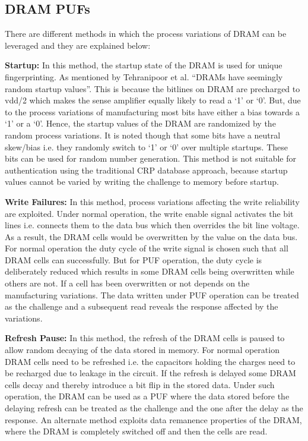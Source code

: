 \documentclass[journal, a4paper]{IEEEtran}
\begin{document}
\subsection{DRAM PUFs}
There are different methods in which the process variations of DRAM can be leveraged and they are explained below:

\textbf{Startup:} In this method, the startup state of the DRAM is used for unique fingerprinting. As mentioned by Tehranipoor et al. “DRAMs have seemingly random startup values”. This is because the bitlines on DRAM are precharged to vdd/2 which makes the sense amplifier equally likely to read a ‘1’ or ‘0’. But, due to the process variations of manufacturing most bits have either a bias towards a ‘1’ or a ‘0’. Hence, the startup values of the DRAM are randomized by the random process variations. It is noted though that some bits have a neutral skew/bias i.e. they randomly switch to ‘1’ or ‘0’ over multiple startups. These bits can be used for random number generation. This method is not suitable for authentication using the traditional CRP database approach, because startup values cannot be varied by writing the challenge to memory before startup.\cite{TEH15}

\textbf{Write Failures:} In this method, process variations affecting the write reliability are exploited. Under normal operation, the write enable signal activates the bit lines i.e. connects them to the data bus which then overrides the bit line voltage. As a result, the DRAM cells would be overwritten by the value on the data bus. For normal operation the duty cycle of the write signal is chosen such that all DRAM cells can successfully. But for PUF operation, the duty cycle is deliberately reduced which results in some DRAM cells being overwritten while others are not. If a cell has been overwritten or not depends on the manufacturing variations. The data written under PUF operation can be treated as the challenge and a subsequent read reveals the response affected by the variations. \cite{HASH}

\textbf{Refresh Pause:} In this method, the refresh of the DRAM cells is paused to allow random decaying of the data stored in memory. \cite{SUT18} \cite{XIO16} \cite{SCH19} \cite{MISK} For normal operation DRAM cells need to be refreshed i.e. the capacitors holding the charges need to be recharged due to leakage in the circuit. If the refresh is delayed some DRAM cells decay and thereby introduce a bit flip in the stored data. Under such operation, the DRAM can be used as a PUF where the data stored before the delaying refresh can be treated as the challenge and the one after the delay as the response. An alternate method exploits data remanence properties of the DRAM, where the DRAM is completely switched off and then the cells are read. \cite{REM}
\end{document}
